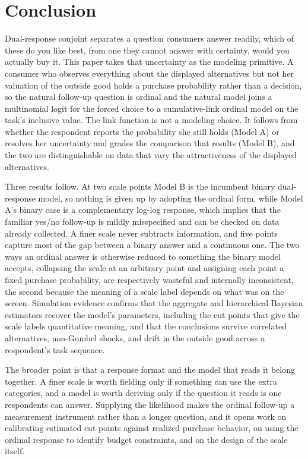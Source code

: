 \documentclass[
  letterpaper,
  DIV=11,
  numbers=noendperiod]{scrartcl}
\theoremstyle{plain}
\theoremstyle{plain}
\theoremstyle{remark}
\begin{document}
\section{Conclusion}\label{sec-conclusion}

Dual-response conjoint separates a question consumers answer readily,
which of these do you like best, from one they cannot answer with
certainty, would you actually buy it. This paper takes that uncertainty
as the modeling primitive. A consumer who observes everything about the
displayed alternatives but not her valuation of the outside good holds a
purchase probability rather than a decision, so the natural follow-up
question is ordinal and the natural model joins a multinomial logit for
the forced choice to a cumulative-link ordinal model on the task's
inclusive value. The link function is not a modeling choice. It follows
from whether the respondent reports the probability she still holds
(Model A) or resolves her uncertainty and grades the comparison that
results (Model B), and the two are distinguishable on data that vary the
attractiveness of the displayed alternatives.

Three results follow. At two scale points Model B is the incumbent
binary dual-response model, so nothing is given up by adopting the
ordinal form, while Model A's binary case is a complementary log-log
response, which implies that the familiar yes/no follow-up is mildly
misspecified and can be checked on data already collected. A finer scale
never subtracts information, and five points capture most of the gap
between a binary answer and a continuous one. The two ways an ordinal
answer is otherwise reduced to something the binary model accepts,
collapsing the scale at an arbitrary point and assigning each point a
fixed purchase probability, are respectively wasteful and internally
inconsistent, the second because the meaning of a scale label depends on
what was on the screen. Simulation evidence confirms that the aggregate
and hierarchical Bayesian estimators recover the model's parameters,
including the cut points that give the scale labels quantitative
meaning, and that the conclusions survive correlated alternatives,
non-Gumbel shocks, and drift in the outside good across a respondent's
task sequence.

The broader point is that a response format and the model that reads it
belong together. A finer scale is worth fielding only if something can
use the extra categories, and a model is worth deriving only if the
question it reads is one respondents can answer. Supplying the
likelihood makes the ordinal follow-up a measurement instrument rather
than a longer question, and it opens work on calibrating estimated cut
points against realized purchase behavior, on using the ordinal response
to identify budget constraints, and on the design of the scale itself.
\end{document}
